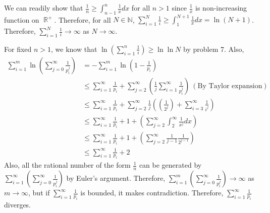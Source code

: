 \documentclass[12pt]{article}
\newenvironment{problem}[2][Problem]{\begin{trivlist}
\item[\hskip \labelsep {\bfseries #1}\hskip \labelsep {\bfseries #2.}]}{\end{trivlist}}
\DeclareMathOperator{\rr}{\mathbb{R}}
\begin{document}
\begin{problem}{7}
\end{problem}
We can readily show that $\frac{1}{n}\geq \int_{n-1}^{n} \frac{1}{x} dx$ for all $n>1$ since $\frac{1}{x}$ is non-increasing function on $\rr^+$. Therefore, for all $N\in \mathbb{N}$, $\sum\limits_{i=1}^N \frac{1}{i}\geq \int_1^{N+1}\frac{1}{x} dx=\ln(N+1)$. Therefore, $\sum\limits_{i=1}^N \frac{1}{i}\rightarrow \infty$ as $N\rightarrow \infty$.



\begin{problem}{8}
\end{problem}
For fixed $n>1$, we know that $\ln \left(\sum\limits_{i=1}^n \frac{1}{i}\right)\geq \ln \ln N$ by problem 7. Also,
\begin{equation*}
\begin{split}
\sum\limits_{i=1}^m \ln \left(\sum\limits_{j=0}^\infty \frac{1}{p_i^j}\right)&=-\sum\limits_{i=1}^m \ln \left(1-\frac{1}{p_i}\right) \\
&\leq \sum\limits_{i=1}^\infty \frac{1}{p_i} + \sum\limits_{j=2}^\infty \left(\frac{1}{j}\sum\limits_{i=1}^\infty \frac{1}{p^j_i}\right)~(\textrm{By Taylor expansion}) \\
&\leq \sum\limits_{i=1}^\infty \frac{1}{p_i} + \sum\limits_{j=2}^\infty \frac{1}{j}\left(\left(\frac{1}{2^j}\right)+\sum\limits_{i=3}^\infty \frac{1}{i^j}\right) \\
&\leq \sum\limits_{i=1}^\infty \frac{1}{p_i} + 1+\left(\sum\limits_{j=2}^\infty \int_2^\infty \frac{1}{x^j} dx \right) \\
&\leq \sum\limits_{i=1}^\infty \frac{1}{p_i} + 1+\left(\sum\limits_{j=2}^\infty \frac{1}{j-1}\frac{1}{2^{j-1}}\right) \\
&\leq \sum\limits_{i=1}^\infty \frac{1}{p_i} + 2
\end{split}
\end{equation*}
Also, all the rational number of the form $\frac{1}{n}$ can be generated by $\sum\limits_{i=1}^\infty\left(\sum\limits_{j=0}^\infty \frac{1}{p_i^j}\right)$ by Euler's argument. Therefore, $\sum\limits_{i=1}^m\left(\sum\limits_{j=0}^\infty \frac{1}{p_i^j}\right)\rightarrow \infty$ as $m\rightarrow \infty$, but if $\sum\limits_{i=1}^\infty \frac{1}{p_i}$ is bounded, it makes contradiction. Therefore, $\sum\limits_{i=1}^\infty \frac{1}{p_i}$ diverges.
\end{document}
